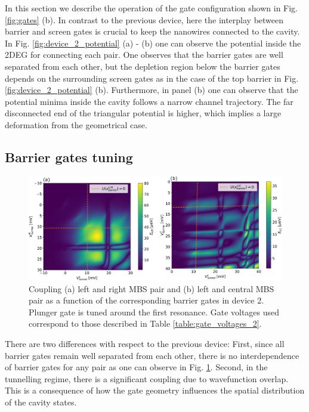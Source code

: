 In this section we describe the operation of the gate configuration shown in Fig. \ref{fig:gates} (b).
In contrast to the previous device, here the interplay between barrier and screen gates is crucial to keep the nanowires connected to the cavity.
In Fig. \ref{fig:device_2_potential} (a) - (b) one can observe the potential inside the 2DEG for connecting each pair.
One observes that the barrier gates are well separated from each other, but the depletion region below the barrier gates depends on the surrounding screen gates as in the case of the top barrier in Fig. \ref{fig:device_2_potential} (b).
Furthermore, in panel (b) one can observe that the potential minima inside the cavity follows a narrow channel trajectory.
The far disconnected end of the triangular potential is higher, which implies a large deformation from the geometrical case.

\subsection{Barrier gates tuning}

\begin{figure}
\centering
  \includegraphics[width=\linewidth]{figures/device_2_barriers.pdf}
  \caption{Coupling (a) left and right MBS pair and (b) left and central MBS pair as a function of the corresponding barrier gates in device 2. Plunger gate is tuned around the first resonance. Gate voltages used correspond to those described in Table \ref{table:gate_voltages_2}.}
  \label{fig:device_2_barriers}
\end{figure}

There are two differences with respect to the previous device:
First, since all barrier gates remain well separated from each other, there is no interdependence of barrier gates for any pair as one can observe in Fig. \ref{fig:device_2_barriers}.
Second, in the tunnelling regime, there is a significant coupling due to wavefunction overlap.
This is a consequence of how the gate geometry influences the spatial distribution of the cavity states.

